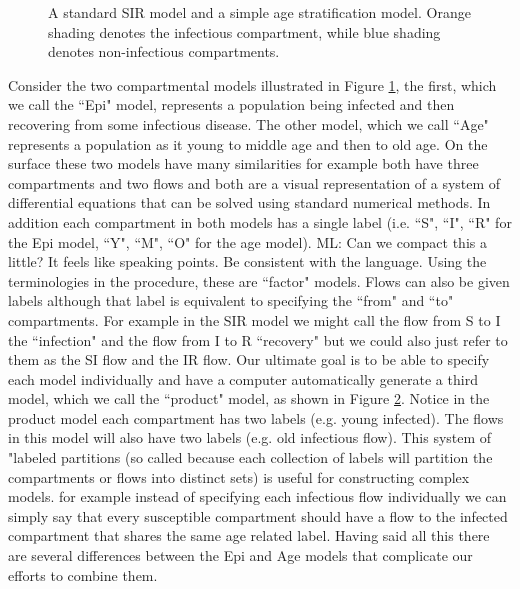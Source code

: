 \documentclass[referee,sn-basic]{sn-jnl}%
\theoremstyle{definition}
\newcommand{\mli}[1]{{\color{purple} ML: #1}}
\begin{document}
\FloatBarrier
\begin{figure}
    \centering
    
    \caption{A standard SIR model and a simple age stratification model. Orange shading denotes the infectious compartment, while blue shading denotes non-infectious compartments.}
    \label{fig:sir_age_strat}
\end{figure}

\begin{figure}
    \centering
    
    \caption{}
    \label{fig:simple_sir_age}
\end{figure}

Consider the two compartmental models illustrated in Figure \ref{fig:sir_age_strat}, the first, which we call the ``Epi" model, represents a population being infected and then recovering from some infectious disease. The other model, which we call ``Age" represents a population as it young to middle age and then to old age. On the surface these two models have many similarities for example both have three compartments and two flows and both are a visual representation of a system of differential equations that can be solved using standard numerical methods. In addition each compartment in both models has a single label (i.e. ``S", ``I", ``R" for the Epi model, ``Y", ``M", ``O" for the age model). \mli{Can we compact this a little? It feels like speaking points. Be consistent with the language. Using the terminologies in the procedure, these are ``factor" models.} Flows can also be given labels although that label is equivalent to specifying the ``from" and ``to" compartments. For example in the SIR model we might call the flow from S to I the ``infection" and the flow from I to R ``recovery" but we could also just refer to them as the SI flow and the IR flow. Our ultimate goal is to be able to specify each model individually and have a computer automatically generate a third model, which we call the ``product" model, as shown in Figure \ref{fig:simple_sir_age}. Notice in the product model each compartment has two labels (e.g. young infected). The flows in this model will also have two labels (e.g. old infectious flow). This system of "labeled partitions (so called because each collection of labels will partition the compartments or flows into distinct sets) is useful for constructing complex models. for example instead of specifying each infectious flow individually we can simply say that every susceptible compartment should have a flow to the infected compartment that shares the same age related label. Having said all this there are several differences between the Epi and Age models that complicate our efforts to combine them.
\end{document}
